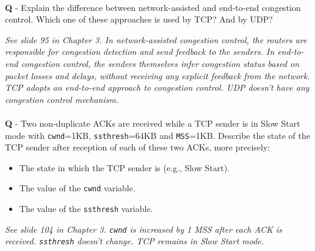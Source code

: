 \documentclass{llncs}
\newcounter{ques}
\renewcommand{\question}[1]{\paragraph{}\textbf{Q\theques} - #1\stepcounter{ques} }
\newcommand{\answer}[1]{\color{red}\textit{#1}\color{black}}
\begin{document}
\newpage


\question{Explain the difference between network-assisted and end-to-end
  congestion control. Which one of these approaches is used by TCP? And by UDP?}

\answer{See slide 95 in Chapter 3. In network-assisted congestion
  control, the routers are responsible for congestion detection and
  send feedback to the senders. In end-to-end congestion control, the
  senders themselves infer congestion status based on packet losses
  and delays, without receiving any explicit feedback from the
  network. TCP adopts an end-to-end approach to congestion
  control. UDP doesn't have any congestion control mechanism.}

\newpage



\question{Two non-duplicate ACKs are received while a TCP sender is in Slow Start mode with \texttt{cwnd}=1KB, \texttt{ssthresh}=64KB and \texttt{MSS}=1KB. Describe the state of the TCP sender after reception of each of these two ACKs, more precisely:
  \begin{itemize}
  \item The state in which the TCP sender is (e.g., Slow Start).
  \item The value of the \texttt{cwnd} variable.
  \item The value of the \texttt{ssthresh} variable.
  \end{itemize}
}

\answer{See slide 104 in Chapter 3. \texttt{cwnd} is increased by 1 MSS after each ACK is received. \texttt{ssthresh} doesn't change. TCP remains in Slow Start mode.}
\end{document}
